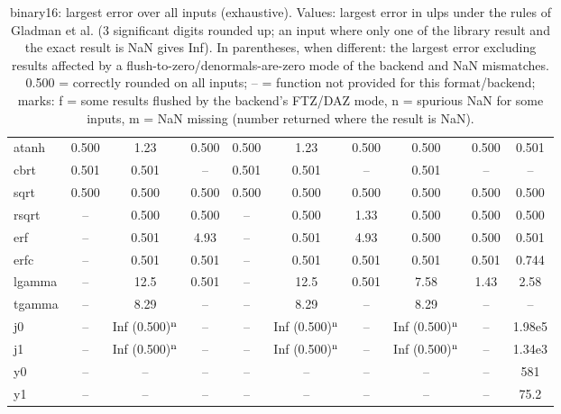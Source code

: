 \begin{table}
\begin{small}
\begin{tabular}{|l|ccc|ccc|cc|c|}
atanh & 0.500 & 1.23 & 0.500 & 0.500 & 1.23 & 0.500 & 0.500 & 0.500 & 0.501 \\
cbrt & 0.501 & 0.501 & -- & 0.501 & 0.501 & -- & 0.501 & -- & -- \\
sqrt & 0.500 & 0.500 & 0.500 & 0.500 & 0.500 & 0.500 & 0.500 & 0.500 & 0.500 \\
rsqrt & -- & 0.500 & 0.500 & -- & 0.500 & 1.33 & 0.500 & 0.500 & 0.500 \\
erf & -- & 0.501 & 4.93 & -- & 0.501 & 4.93 & 0.500 & 0.500 & 0.501 \\
erfc & -- & 0.501 & 0.501 & -- & 0.501 & 0.501 & 0.501 & 0.501 & 0.744 \\
lgamma & -- & 12.5 & 0.501 & -- & 12.5 & 0.501 & 7.58 & 1.43 & 2.58 \\
tgamma & -- & 8.29 & -- & -- & 8.29 & -- & 8.29 & -- & -- \\
j0 & -- & Inf (0.500)$^{\rm n}$ & -- & -- & Inf (0.500)$^{\rm n}$ & -- & Inf (0.500)$^{\rm n}$ & -- & 1.98e5 \\
j1 & -- & Inf (0.500)$^{\rm n}$ & -- & -- & Inf (0.500)$^{\rm n}$ & -- & Inf (0.500)$^{\rm n}$ & -- & 1.34e3 \\
y0 & -- & -- & -- & -- & -- & -- & -- & -- & 581 \\
y1 & -- & -- & -- & -- & -- & -- & -- & -- & 75.2 \\
\hline
\end{tabular}
\end{small}
\caption{binary16: largest error over all inputs (exhaustive). Values: largest error in ulps under the rules of Gladman et al. (3 significant digits rounded up; an input where only one of the library result and the exact result is NaN gives Inf). In parentheses, when different: the largest error excluding results affected by a flush-to-zero/denormals-are-zero mode of the backend and NaN mismatches. 0.500 = correctly rounded on all inputs; -- = function not provided for this format/backend; marks: f = some results flushed by the backend's FTZ/DAZ mode, n = spurious NaN for some inputs, m = NaN missing (number returned where the result is NaN). }
\label{tab:binary16}
\end{table}
